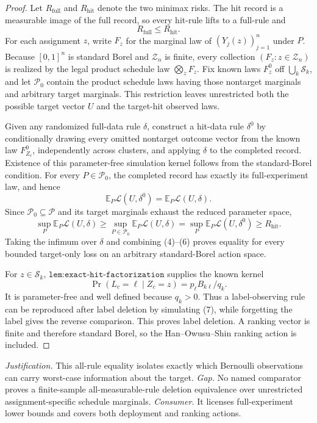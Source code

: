 \documentclass{article}
\begin{document}
\begin{proof}
Let \(R_{\mathrm{full}}\) and \(R_{\mathrm{hit}}\) denote the two minimax risks.  The hit record is a measurable image of the full record, so every hit-rule lifts to a full-rule and
\[
 R_{\mathrm{full}}\leq R_{\mathrm{hit}}. \tag{4}
\]
For each assignment \(z\), write \(F_z\) for the marginal law of \((Y_j(z))_{j=1}^n\) under \(P\).  Because \([0,1]^n\) is standard Borel and \(\mathcal Z_n\) is finite, every collection \((F_z:z\in\mathcal Z_n)\) is realized by the legal product schedule law \(\bigotimes_zF_z\).  Fix known laws \(F_z^0\) off \(\bigcup_k\mathcal S_k\), and let \(\mathcal P_0\) contain the product schedule laws having those nontarget marginals and arbitrary target marginals.  This restriction leaves unrestricted both the possible target vector \(U\) and the target-hit observed laws.

Given any randomized full-data rule \(\delta\), construct a hit-data rule \(\delta^0\) by conditionally drawing every omitted nontarget outcome vector from the known law \(F_{Z_c}^0\), independently across clusters, and applying \(\delta\) to the completed record.  Existence of this parameter-free simulation kernel follows from the standard-Borel condition.  For every \(P\in\mathcal P_0\), the completed record has exactly its full-experiment law, and hence
\[
 \mathbb E_P\mathcal L(U,\delta^0)=\mathbb E_P\mathcal L(U,\delta). \tag{5}
\]
Since \(\mathcal P_0\subseteq\mathcal P\) and its target marginals exhaust the reduced parameter space,
\[
 \sup_P\mathbb E_P\mathcal L(U,\delta)
 \geq\sup_{P\in\mathcal P_0}\mathbb E_P\mathcal L(U,\delta)
 =\sup_P\mathbb E_P\mathcal L(U,\delta^0)
 \geq R_{\mathrm{hit}}. \tag{6}
\]
Taking the infimum over \(\delta\) and combining (4)--(6) proves equality for every bounded target-only loss on an arbitrary standard-Borel action space.

For \(z\in\mathcal S_k\), \(\texttt{lem:exact-hit-factorization}\) supplies the known kernel
\[
 \Pr(L_c=\ell\mid Z_c=z)=p_\ell B_{k\ell}/q_k. \tag{7}
\]
It is parameter-free and well defined because \(q_k>0\).  Thus a label-observing rule can be reproduced after label deletion by simulating (7), while forgetting the label gives the reverse comparison.  This proves label deletion.  A ranking vector is finite and therefore standard Borel, so the Han--Owusu--Shin ranking action is included.
\end{proof}
\par\smallskip\noindent \textit{Justification.} This all-rule equality isolates exactly which Bernoulli observations can carry worst-case information about the target. \textit{Gap.} No named comparator proves a finite-sample all-measurable-rule deletion equivalence over unrestricted assignment-specific schedule marginals. \textit{Consumer.} It licenses full-experiment lower bounds and covers both deployment and ranking actions.
\end{document}
